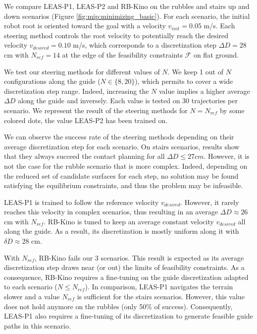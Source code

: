 We compare LEAS-P1, LEAS-P2 and RB-Kino on the rubbles and stairs up and down scenarios (Figure \ref{fig:mip:minimizing_basic}).
For each scenario, the initial robot root is oriented toward the goal with a velocity $v_{init}=0.05$ m/s.
Each steering method controls the root velocity to potentially reach the desired velocity $v_{desired}=0.10$ m/s, which corresponds to a discretization step $\Delta D=28$ cm with $N_{ref}=14$ at the edge of the feasibility constraints $\mathcal{F}$ on flat ground.

We test our steering methods for different values of $N$. 
We keep 1 out of $N$ configurations along the guide ($N \in \{8,20\}$), which permits to cover a wide discretization step range.
Indeed, increasing the $N$ value implies a higher average $\Delta D$ along the guide and inversely.
Each value is tested on 30 trajectories per scenario.
We represent the result of the steering methods for $N=N_{ref}$ by some colored dots, the value LEAS-P2 has been trained on.

We can observe the success rate of the steering methods depending on their average discretization step for each scenario.
On stairs scenarios, results show that they always succeed the contact planning for all $\Delta D \leq 27 cm$.
However, it is not the case for the rubble scenario that is more complex. Indeed, depending on the reduced set of candidate surfaces for each step, no solution may be found satisfying the equilibrium constraints, and thus the problem may be infeasible.

LEAS-P1 is trained to follow the reference velocity $v_{desired}$.
However, it rarely reaches this velocity in complex scenarios, thus resulting in an average $\Delta D \approx 26$ cm with $N_{ref}$.
RB-Kino is tuned to keep an average constant velocity $v_{desired}$ all along the guide. As a result, its discretization is mostly uniform along it with $\delta D \approx 28$ cm.

With $N_{ref}$, RB-Kino fails our 3 scenarios. This result is expected as its average discretization step draws near (or out) the limits of feasibility constraints.
As a consequence, RB-Kino requires a fine-tuning on the guide discretization adapted to each scenario ($N \leq N_{ref}$).
In comparison, LEAS-P1 navigates the terrain slower and a value $N_{ref}$ is sufficient for the stairs scenarios. 
However, this value does not hold anymore on the rubbles (only 50\% of success). 
Consequently, LEAS-P1 also requires a fine-tuning of its discretization to generate feasible guide paths in this scenario.

